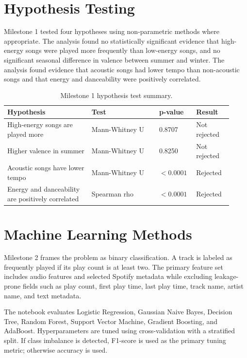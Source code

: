 \documentclass[conference]{IEEEtran}
\begin{document}
\section{Hypothesis Testing}
Milestone 1 tested four hypotheses using non-parametric methods where appropriate. The analysis found no statistically significant evidence that high-energy songs were played more frequently than low-energy songs, and no significant seasonal difference in valence between summer and winter. The analysis found evidence that acoustic songs had lower tempo than non-acoustic songs and that energy and danceability were positively correlated.

\begin{table}[htbp]
\centering
\caption{Milestone 1 hypothesis test summary.}
\begin{tabular}{p{0.35\linewidth}p{0.28\linewidth}p{0.14\linewidth}p{0.15\linewidth}}
\toprule
Hypothesis & Test & p-value & Result \\
\midrule
High-energy songs are played more & Mann-Whitney U & 0.8707 & Not rejected \\
Higher valence in summer & Mann-Whitney U & 0.8250 & Not rejected \\
Acoustic songs have lower tempo & Mann-Whitney U & $<0.0001$ & Rejected \\
Energy and danceability are positively correlated & Spearman rho & $<0.0001$ & Rejected \\
\bottomrule
\end{tabular}
\label{tab:hypothesis_summary}
\end{table}

\section{Machine Learning Methods}
Milestone 2 frames the problem as binary classification. A track is labeled as frequently played if its play count is at least two. The primary feature set includes audio features and selected Spotify metadata while excluding leakage-prone fields such as play count, first play time, last play time, track name, artist name, and text metadata.

The notebook evaluates Logistic Regression, Gaussian Naive Bayes, Decision Tree, Random Forest, Support Vector Machine, Gradient Boosting, and AdaBoost. Hyperparameters are tuned using cross-validation with a stratified split. If class imbalance is detected, F1-score is used as the primary tuning metric; otherwise accuracy is used.
\end{document}
